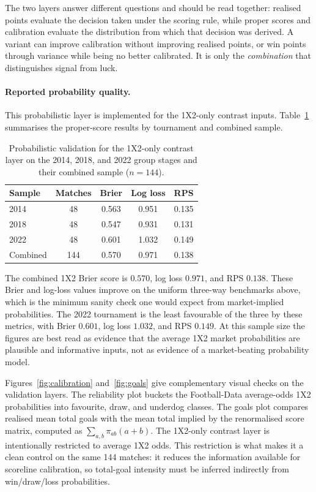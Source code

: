 \documentclass[11pt]{article}
\begin{document}
The two layers answer different questions and should be read together: realised points evaluate
the decision taken under the scoring rule, while proper scores and calibration evaluate the
distribution from which that decision was derived. A variant can improve calibration without
improving realised points, or win points through variance while being no better calibrated. It is only
the \textit{combination} that distinguishes signal from luck.

\paragraph{Reported probability quality.} This probabilistic layer is implemented for the 1X2-only contrast inputs.
Table~\ref{tab:prob} summarises the proper-score results by tournament
and combined sample.
\begin{table}[htbp]
\centering
\small
\begin{tabular}{lcccc}
\toprule
Sample & Matches & Brier & Log loss & RPS \\
\midrule
2014     & 48  & 0.563 & 0.951 & 0.135 \\
2018     & 48  & 0.547 & 0.931 & 0.131 \\
2022     & 48  & 0.601 & 1.032 & 0.149 \\
Combined & 144 & 0.570 & 0.971 & 0.138 \\
\bottomrule
\end{tabular}
\caption{Probabilistic validation for the 1X2-only contrast layer on the 2014, 2018,
and 2022 group stages and their combined sample (\(n=144\)).}
\label{tab:prob}
\end{table}

The combined 1X2 Brier score is \(0.570\), log loss \(0.971\), and RPS
\(0.138\). These Brier and log-loss values improve on the uniform three-way benchmarks above,
which is the minimum sanity check one would expect from market-implied probabilities. The 2022
tournament is the least favourable of the three by these metrics, with Brier \(0.601\), log
loss \(1.032\), and RPS \(0.149\). At this sample size the figures are best read as evidence
that the average 1X2 market probabilities are plausible and informative inputs, not as evidence
of a market-beating probability model.

Figures~\ref{fig:calibration} and~\ref{fig:goals} give complementary visual checks on the
validation layers. The reliability plot buckets the Football-Data average-odds 1X2
probabilities into favourite, draw, and underdog classes. The goals plot compares realised
mean total goals with the mean total implied by the renormalised score matrix, computed as
\(\sum_{a,b}\pi_{ab}(a+b)\). The 1X2-only contrast layer is intentionally restricted to
average 1X2 odds. This restriction is what makes it a clean control on the same 144 matches: it
reduces the information available for scoreline calibration, so total-goal intensity must be
inferred indirectly from win/draw/loss probabilities.
\end{document}

